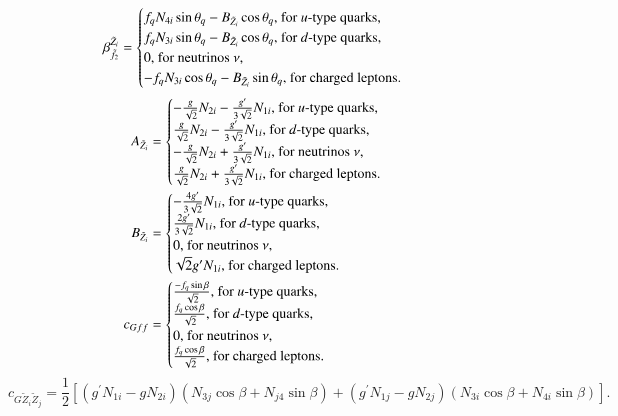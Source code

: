 \documentclass[final,3p,times,pdflatex]{elsarticle}
\begin{document}
\begin{equation}
{\beta_{\tilde{f}_2}^{\tilde{Z}_i}} = \begin{cases}
f_{q}N_{4i}\sin\theta_q - B_{\tilde{Z}_i}\cos\theta_q, $ for $u$-type quarks,$ \\
f_{q}N_{3i}\sin\theta_q - B_{\tilde{Z}_i}\cos\theta_q, $ for $d$-type quarks,$ \\
0, $ for neutrinos $ \nu$,$ \\
-f_{q}N_{3i}\cos\theta_q - B_{\tilde{Z}_i}\sin\theta_q, $ for charged leptons$. 
\end{cases}
\end{equation}
\begin{align}
{A_{\tilde{Z}_i}} &= \begin{cases}
-{g \over \sqrt{2}}N_{2i} - {g' \over 3 \sqrt{2}}N_{1i}, $ for $u$-type quarks,$ \\
{g \over \sqrt{2}}N_{2i} - {g' \over 3 \sqrt{2}}N_{1i}, $ for $d$-type quarks,$ \\
-{g \over \sqrt{2}}N_{2i} + {g' \over 3 \sqrt{2}}N_{1i}, $ for neutrinos $ \nu$,$ \\
{g \over \sqrt{2}}N_{2i} + {g' \over 3 \sqrt{2}}N_{1i}, $ for charged leptons$. 
\end{cases} \\
{B_{\tilde{Z}_i}} &= \begin{cases}
-{4 g' \over 3 \sqrt{2}}N_{1i}, $ for $u$-type quarks,$ \\
{2 g' \over 3 \sqrt{2}}N_{1i}, $ for $d$-type quarks,$ \\
0, $ for neutrinos $ \nu $,$\\
\sqrt{2}g' N_{1i}, $ for charged leptons$. 
\end{cases} \\
c_{G f f} &= \begin{cases}
{-f_{q} \sin\beta \over \sqrt{2}}, $ for $u$-type quarks,$ \\
{f_{q} \cos\beta \over \sqrt{2}}, $ for $d$-type quarks,$ \\
{0}, $ for neutrinos $ \nu$,$ \\
{f_{q} \cos\beta \over \sqrt{2}}, $ for charged leptons$. 
\end{cases}
\end{align}
\begin{equation}
c_{G \tilde{Z}_i \tilde{Z}_j} = \frac{1}{2}\left[(g^{'}N_{1i} - g N_{2i})(N_{3j} \cos\beta + N_{j4}\sin\beta) + (g^{'} N_{1j} - gN_{2j})(N_{3i}\cos\beta + N_{4i}\sin\beta)\right].
\end{equation}
\end{document}
